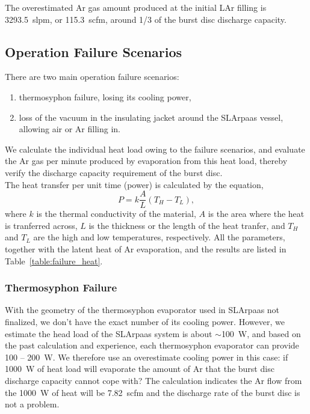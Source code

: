 The overestimated Ar gas amount produced at the initial LAr filling
is 3293.5~slpm, or 115.3~scfm, around 1/3 of the burst disc discharge capacity.

\subsection{Operation Failure Scenarios}

There are two main operation failure scenarios:
\begin{enumerate}
    \item thermosyphon failure, losing its cooling power,
    \item loss of the vacuum in the insulating jacket around the SLArpaas vessel, 
    allowing air or Ar filling in.
\end{enumerate}
We calculate the individual heat load owing to the failure scenarios,
and evaluate the Ar gas per minute produced by evaporation from this heat load,
thereby verify the discharge capacity requirement of the burst disc.\\

The heat transfer per unit time (power) is calculated by the equation,
\begin{equation}
    \label{eq:heat_transfer}
    P = k\frac{A}{L}(T_H-T_L),
\end{equation}
where $k$ is the thermal conductivity of the material, $A$ is the area where
the heat is tranferred across, $L$ is the thickness or the length of the 
heat tranfer, and $T_H$ and $T_L$ are the high and low temperatures, respectively.
All the parameters, together with the latent heat of Ar evaporation,
and the results
are listed in Table~\ref{table:failure_heat}.



\subsubsection{Thermosyphon Failure}

With the geometry of the thermosyphon evaporator used in SLArpaas not finalized,
we don't have the exact number of its cooling power.
However, we estimate the head load of the SLArpaas system is about $\sim$100~W,
and based on the past calculation and experience, each thermosyphon evaporator
can provide 100 -- 200~W.
We therefore use an overestimate cooling power in this case: if 1000~W
of heat load will evaporate the amount of Ar that the burst disc discharge capacity
cannot cope with?
The calculation indicates the Ar flow from the 1000~W of heat will be 7.82~scfm
and the discharge rate of the burst disc is not a problem.

